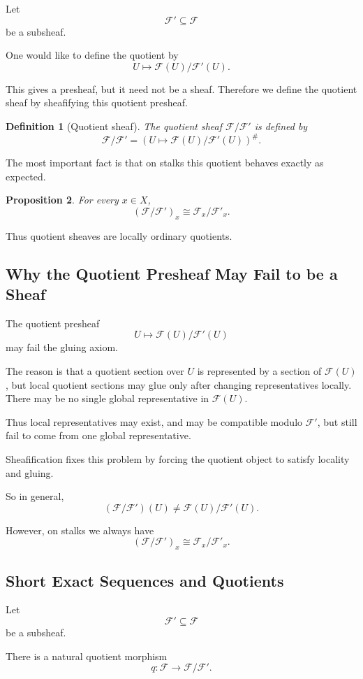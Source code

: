 \documentclass[12pt,a4paper]{article}
\newcommand{\F}{\mathcal F}
\theoremstyle{notespace}
\newtheorem{definition}{Definition}[subsection]
\newtheorem{proposition}[definition]{Proposition}
\newcommand{\Fp}{\mathcal F'}      %
\begin{document}
Let
\[
\Fp\subseteq \F
\]
be a subsheaf.

One would like to define the quotient by
\[
U\longmapsto \F(U)/\Fp(U).
\]

This gives a presheaf, but it need not be a sheaf. Therefore we define the quotient sheaf by sheafifying this quotient presheaf.

\begin{definition}[Quotient sheaf]
	The quotient sheaf \(\F/\Fp\) is defined by
	\[
	\F/\Fp=
	\left(
	U\longmapsto \F(U)/\Fp(U)
	\right)^{\#}.
	\]
\end{definition}

The most important fact is that on stalks this quotient behaves exactly as expected.

\begin{proposition}
	For every \(x\in X\),
	\[
	(\F/\Fp)_x\cong \F_x/\Fp_x.
	\]
\end{proposition}

Thus quotient sheaves are locally ordinary quotients.

\subsection{Why the Quotient Presheaf May Fail to be a Sheaf}

The quotient presheaf
\[
U\longmapsto \F(U)/\Fp(U)
\]
may fail the gluing axiom.

The reason is that a quotient section over \(U\) is represented by a section of \(\F(U)\), but local quotient sections may glue only after changing representatives locally. There may be no single global representative in \(\F(U)\).

Thus local representatives may exist, and may be compatible modulo \(\Fp\), but still fail to come from one global representative.

Sheafification fixes this problem by forcing the quotient object to satisfy locality and gluing.

So in general,
\[
(\F/\Fp)(U)\neq \F(U)/\Fp(U).
\]

However, on stalks we always have
\[
(\F/\Fp)_x\cong \F_x/\Fp_x.
\]

\subsection{Short Exact Sequences and Quotients}

Let
\[
\Fp\subseteq \F
\]
be a subsheaf.

There is a natural quotient morphism
\[
q:\F\to \F/\Fp.
\]
\end{document}
